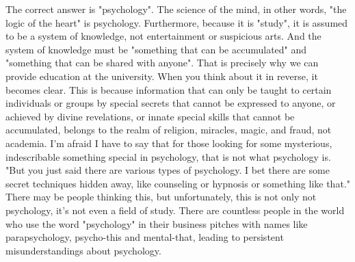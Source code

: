 \documentclass{ltjsbook}
\begin{document}
The correct answer is "psychology". The science of the mind, in other words, "the logic of the heart" is psychology.
Furthermore, because it is "study", it is assumed to be a system of knowledge, not entertainment or suspicious arts.
And the system of knowledge must be "something that can be accumulated" and "something that can be shared with anyone".
That is precisely why we can provide education at the university.
When you think about it in reverse, it becomes clear.
This is because information that can only be taught to certain individuals or groups by special secrets that cannot be expressed to anyone, or achieved by divine revelations, or innate special skills that cannot be accumulated, belongs to the realm of religion, miracles, magic, and fraud, not academia.
I'm afraid I have to say that for those looking for some mysterious, indescribable something special in psychology, that is not what psychology is. "But you just said there are various types of psychology. I bet there are some secret techniques hidden away, like counseling or hypnosis or something like that." There may be people thinking this, but unfortunately, this is not only not psychology, it's not even a field of study. There are countless people in the world who use the word "psychology" in their business pitches with names like parapsychology, psycho-this and mental-that, leading to persistent misunderstandings about psychology.
\end{document}
